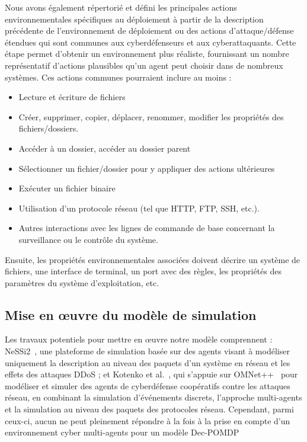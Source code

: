 \begin{enumerate*}[label=\arabic*),itemjoin={;\quad}]
    \item Nous avons également répertorié et défini les principales actions environnementales spécifiques au déploiement à partir de la description précédente de l'environnement de déploiement ou des actions d'attaque/défense étendues qui sont communes aux cyberdéfenseurs et aux cyberattaquants. Cette étape permet d'obtenir un environnement plus réaliste, fournissant un nombre représentatif d'actions plausibles qu'un agent peut choisir dans de nombreux systèmes.
    Ces actions communes pourraient inclure au moins :
    \begin{itemize}
        \item Lecture et écriture de fichiers
        \item Créer, supprimer, copier, déplacer, renommer, modifier les propriétés des fichiers/dossiers.
        \item Accéder à un dossier, accéder au dossier parent
        \item Sélectionner un fichier/dossier pour y appliquer des actions ultérieures
        \item Exécuter un fichier binaire
        \item Utilisation d'un protocole réseau (tel que HTTP, FTP, SSH, etc.).
        \item Autres interactions avec les lignes de commande de base concernant la surveillance ou le contrôle du système.
    \end{itemize}
    Ensuite, les propriétés environnementales associées doivent décrire un système de fichiers, une interface de terminal, un port avec des règles, les propriétés des paramètres du système d'exploitation, etc.

\end{enumerate*}

\subsection{Mise en œuvre du modèle de simulation}

\noindent
Les travaux potentiels pour mettre en œuvre notre modèle comprennent : NeSSi2~\cite{DGrunewald2011}, une plateforme de simulation basée sur des agents visant à modéliser uniquement la description au niveau des paquets d'un système en réseau et les effets des attaques DDoS ; et Kotenko et al.~\cite{IKotenko2007}, qui s'appuie sur OMNet++~\cite{Varga2010} pour modéliser et simuler des agents de cyberdéfense coopératifs contre les attaques réseau, en combinant la simulation d'événements discrets, l'approche multi-agents et la simulation au niveau des paquets des protocoles réseau.
Cependant, parmi ceux-ci, aucun ne peut pleinement répondre à la fois à la prise en compte d'un environnement cyber multi-agents pour un modèle Dec-POMDP

